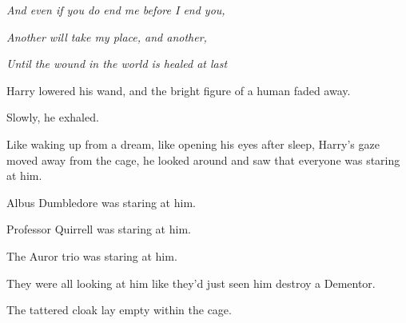 \emph{And even if you do end me before I end you,}

\emph{Another will take my place, and another,}

\emph{Until the wound in the world is healed at last{\el}}

Harry lowered his wand, and the bright figure of a human faded away.

Slowly, he exhaled.

Like waking up from a dream, like opening his eyes after sleep, Harry's gaze
moved away from the cage, he looked around and saw that everyone was staring at
him.

Albus Dumbledore was staring at him.

Professor Quirrell was staring at him.

The Auror trio was staring at him.

They were all looking at him like they'd just seen him destroy a Dementor.

The tattered cloak lay empty within the cage.
